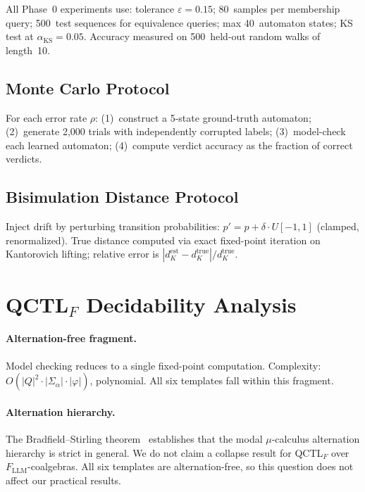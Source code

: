 \documentclass[11pt]{article}
\newcommand{\qctlf}{QCTL$_F$}
\begin{document}
All Phase~0 experiments use:
tolerance $\varepsilon = 0.15$;
80~samples per membership query;
500~test sequences for equivalence queries;
max 40~automaton states;
KS test at $\alpha_{\mathrm{KS}} = 0.05$.
Accuracy measured on 500~held-out random walks of length~10.

\subsection{Monte Carlo Protocol}

For each error rate $\rho$: (1)~construct a 5-state ground-truth
automaton; (2)~generate 2{,}000 trials with independently corrupted
labels; (3)~model-check each learned automaton; (4)~compute verdict
accuracy as the fraction of correct verdicts.

\subsection{Bisimulation Distance Protocol}

Inject drift by perturbing transition probabilities:
$p' = p + \delta \cdot U[-1, 1]$ (clamped, renormalized).
True distance computed via exact fixed-point iteration on
Kantorovich lifting; relative error is
$|d_K^{\mathrm{est}} - d_K^{\mathrm{true}}| / d_K^{\mathrm{true}}$.

\section{\qctlf{} Decidability Analysis}\label{app:decidability}

\paragraph{Alternation-free fragment.}
Model checking reduces to a single fixed-point computation.
Complexity: $O(|Q|^2 \cdot |\Sigma_\alpha| \cdot |\varphi|)$,
polynomial.  All six templates fall within this fragment.

\paragraph{Alternation hierarchy.}
The Bradfield--Stirling theorem~\cite{bradfield1999fixpoint}
establishes that the modal $\mu$-calculus alternation hierarchy
is strict in general.  We do not claim a collapse result for
\qctlf{} over $F_{\mathrm{LLM}}$-coalgebras.  All six
templates are alternation-free, so this question does not
affect our practical results.
\end{document}
